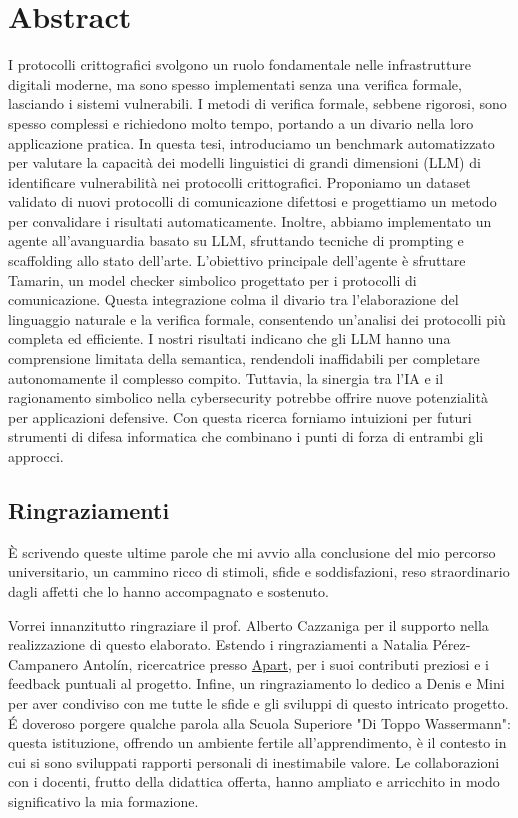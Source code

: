 \documentclass[a4paper,12pt,twoside,openany]{book}
\begin{document}
\chapter*{Abstract}
I protocolli crittografici svolgono un ruolo fondamentale nelle infrastrutture digitali moderne, ma sono spesso implementati senza una verifica formale, lasciando i sistemi vulnerabili. I metodi di verifica formale, sebbene rigorosi, sono spesso complessi e richiedono molto tempo, portando a un divario nella loro applicazione pratica. In questa tesi, introduciamo un benchmark automatizzato per valutare la capacità dei modelli linguistici di grandi dimensioni (LLM) di identificare vulnerabilità nei protocolli crittografici. Proponiamo un dataset validato di nuovi protocolli di comunicazione difettosi e progettiamo un metodo per convalidare i risultati automaticamente. Inoltre, abbiamo implementato un agente all'avanguardia basato su LLM, sfruttando tecniche di prompting e scaffolding allo stato dell'arte. L'obiettivo principale dell'agente è sfruttare Tamarin, un model checker simbolico progettato per i protocolli di comunicazione. Questa integrazione colma il divario tra l'elaborazione del linguaggio naturale e la verifica formale, consentendo un'analisi dei protocolli più completa ed efficiente. I nostri risultati indicano che gli LLM hanno una comprensione limitata della semantica, rendendoli inaffidabili per completare autonomamente il complesso compito. Tuttavia, la sinergia tra l'IA e il ragionamento simbolico nella cybersecurity potrebbe offrire nuove potenzialità per applicazioni defensive. Con questa ricerca forniamo intuizioni per futuri strumenti di difesa informatica che combinano i punti di forza di entrambi gli approcci.
\thispagestyle{empty}

\newpage 


\section*{Ringraziamenti}
\thispagestyle{empty}
È scrivendo queste ultime parole che mi avvio alla conclusione del mio percorso universitario, un cammino ricco di stimoli, sfide e soddisfazioni, reso straordinario dagli affetti che lo hanno accompagnato e sostenuto.

Vorrei innanzitutto ringraziare il prof. Alberto Cazzaniga per il supporto nella realizzazione di questo elaborato. Estendo i ringraziamenti a Natalia Pérez-Campanero Antolín, ricercatrice presso \href{https://www.apartresearch.com/lab}{Apart}, per i suoi contributi preziosi e i feedback puntuali al progetto. Infine, un ringraziamento lo dedico a Denis e Mini per aver condiviso con me tutte le sfide e gli sviluppi di questo intricato progetto. \'E doveroso porgere qualche parola alla Scuola Superiore "Di Toppo Wassermann": questa istituzione, offrendo un ambiente fertile all'apprendimento, è il contesto in cui si sono sviluppati rapporti personali di inestimabile valore. Le collaborazioni con i docenti, frutto della didattica offerta, hanno ampliato e arricchito in modo significativo la mia formazione.
\end{document}
